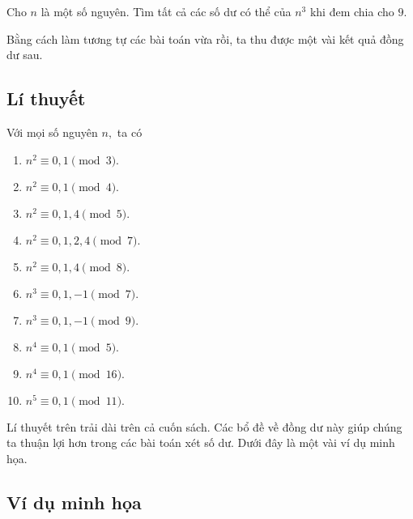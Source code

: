 \begin{bx}
Cho $n$ là một số nguyên. Tìm tất cả các số dư có thể của $n^3$ khi đem chia cho $9.$
\end{bx}

Bằng cách làm tương tự các bài toán vừa rồi, ta thu được một vài kết quả đồng dư sau.

\subsection*{Lí thuyết}

Với mọi số nguyên $n,$ ta có

\begin{multicols}{2}
\begin{enumerate}
    \item $n^2\equiv 0,1\pmod{3}.$
    \item $n^2\equiv 0,1\pmod{4}.$
    \item $n^2\equiv 0,1,4\pmod{5}.$   
    \item $n^2\equiv 0,1,2,4\pmod{7}.$    
    \item $n^2\equiv 0,1,4\pmod{8}.$    
    \item $n^3\equiv 0,1,-1\pmod{7}.$ 
    \item $n^3\equiv 0,1,-1\pmod{9}.$    
    \item $n^4\equiv 0,1\pmod{5}.$    
    \item $n^4\equiv 0,1\pmod{16}.$    
    \item $n^5\equiv 0,1\pmod{11}.$         
\end{enumerate}
\end{multicols}

Lí thuyết trên trải dài trên cả cuốn sách. Các bổ đề về đồng dư này giúp chúng ta thuận lợi hơn trong các bài toán xét số dư. Dưới đây là một vài ví dụ minh họa.

\subsection*{Ví dụ minh họa}

